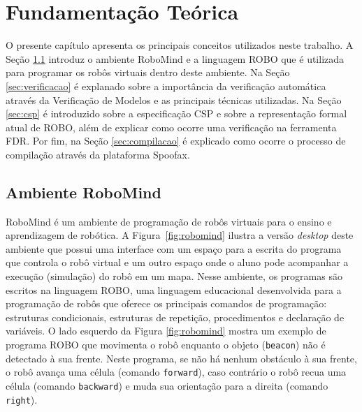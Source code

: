\chapter{Fundamentação Teórica}
\label{chap:cap2}

O presente capítulo apresenta os principais conceitos utilizados neste trabalho. A Seção \ref{sec:ambiente} introduz o ambiente RoboMind e a linguagem ROBO que é utilizada para programar os robôs virtuais dentro deste ambiente. Na Seção \ref{sec:verificacao} é explanado sobre a importância da verificação automática através da Verificação de Modelos e as principais técnicas utilizadas. Na Seção \ref{sec:csp} é introduzido sobre a especificação CSP e sobre a representação formal atual de ROBO, além de explicar como ocorre uma verificação na ferramenta FDR. Por fim, na Seção \ref{sec:compilacao} é explicado como ocorre o processo de compilação através da plataforma Spoofax.

\section{Ambiente RoboMind}
\label{sec:ambiente}


RoboMind é um ambiente de programação de robôs virtuais para o ensino e aprendizagem de robótica. A Figura~\ref{fig:robomind} ilustra a versão \textit{desktop} deste ambiente que possui uma interface com um espaço para a escrita do programa que controla o robô virtual e um outro espaço onde o aluno pode acompanhar a execução (simulação) do robô em um mapa. Nesse ambiente, os programas são escritos na linguagem ROBO, uma linguagem educacional desenvolvida para a programação de robôs que oferece os principais comandos de programação: estruturas condicionais, estruturas de repetição, procedimentos e declaração de variáveis. O lado esquerdo da Figura \ref{fig:robomind} mostra um exemplo de programa ROBO que movimenta o robô enquanto o objeto (\texttt{beacon}) não é detectado à sua frente. Neste programa, se não há nenhum obstáculo à sua frente, o robô avança uma célula (comando \texttt{forward}), caso contrário o robô recua uma célula (comando \texttt{backward}) e muda sua orientação para a direita (comando \texttt{right}).


